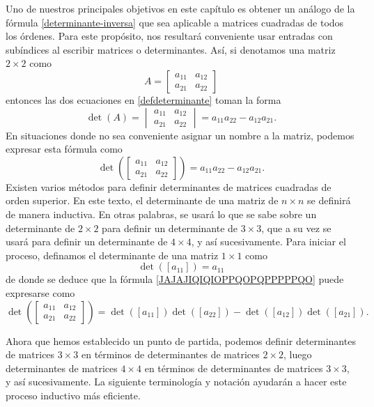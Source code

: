 Uno de nuestros principales objetivos en este capítulo es obtener un análogo de la fórmula \eqref{determinante-inversa} que sea aplicable a matrices cuadradas de todos los órdenes. Para este propósito, nos resultará conveniente usar entradas con subíndices al escribir matrices o determinantes. Así, si denotamos una matriz $2 \times 2$ como
$$A = \begin{bmatrix}
    a_{11} & a_{12} \\
    a_{21} & a_{22}
\end{bmatrix}$$
entonces las dos ecuaciones en \eqref{defdeterminante} toman la forma
\begin{equation}
    \det(A) = \begin{vmatrix}
        a_{11} & a_{12} \\
        a_{21} & a_{22}
    \end{vmatrix} = a_{11}a_{22} - a_{12}a_{21}. \label{eq:determinantesubi}
\end{equation}
En situaciones donde no sea conveniente asignar un nombre a la matriz, podemos expresar esta fórmula como
\begin{equation}
    \det\left(\begin{bmatrix}
        a_{11} & a_{12} \\
        a_{21} & a_{22}
    \end{bmatrix}\right) = a_{11}a_{22} - a_{12}a_{21}. \label{JAJAJIQIQIOPPQOPQPPPPPQO}
\end{equation}
\newpage\noindent
Existen varios métodos para definir determinantes de matrices cuadradas de orden superior. En este texto, el determinante de una matriz de $n \times n$ se definirá de manera inductiva. En otras palabras, se usará lo que se sabe sobre un determinante de $2 \times 2$ para definir un determinante de $3 \times 3$, que a su vez se usará para definir un determinante de $4 \times 4$, y así sucesivamente. Para iniciar el proceso, definamos el determinante de una matriz $1 \times 1$ como
$$\det\left([a_{11}]\right) = a_{11}$$
de donde se deduce que la fórmula \eqref{JAJAJIQIQIOPPQOPQPPPPPQO} puede expresarse como
$$\det\left(\begin{bmatrix}
    a_{11} & a_{12} \\
    a_{21} & a_{22}
\end{bmatrix}\right) = \det\left([a_{11}]\right) \det\left([a_{22}]\right) - \det\left([a_{12}]\right) \det\left([a_{21}]\right).$$

Ahora que hemos establecido un punto de partida, podemos definir determinantes de matrices $3 \times 3$ en términos de determinantes de matrices $2 \times 2$, luego determinantes de matrices $4 \times 4$ en términos de determinantes de matrices $3 \times 3$, y así sucesivamente. La siguiente terminología y notación ayudarán a hacer este proceso inductivo más eficiente.

